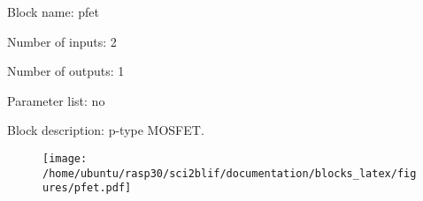 \pagebreak
Block name: pfet

Number of inputs: 2

Number of outputs: 1

Parameter list: no

Block description: 
p-type MOSFET.

\begin{figure}[H]  %
\texttt{[image: /home/ubuntu/rasp30/sci2blif/documentation/blocks\_latex/figures/pfet.pdf]}
\end{figure}

